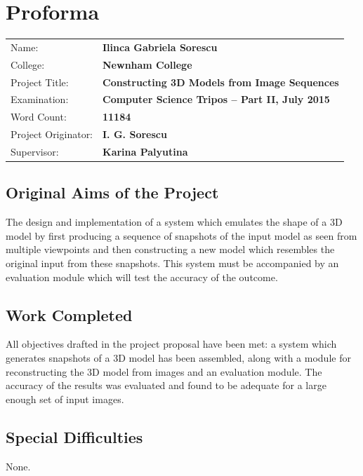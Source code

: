 \documentclass[12pt,a4paper,twoside,openright]{report}
\begin{document}

\pagestyle{plain}

\chapter*{Proforma}

{\large
\begin{tabular}{ll}
Name:               & \bf Ilinca Gabriela Sorescu                       \\
College:            & \bf Newnham College                               \\
Project Title:      & \bf Constructing 3D Models from Image Sequences   \\
Examination:        & \bf Computer Science Tripos -- Part II, July 2015  \\
Word Count:         & \bf 11184 \\
Project Originator: & \bf I. G. Sorescu                     \\
Supervisor:         & \bf Karina Palyutina                  \\ 
\end{tabular}
}



\section*{Original Aims of the Project}
The design and implementation of a system which emulates the shape of a 3D model by first producing a sequence of snapshots of the input model as seen from multiple viewpoints and then constructing a new model which resembles the original input from these snapshots. This system must be accompanied by an evaluation module which will test the accuracy of the outcome.


\section*{Work Completed}
All objectives drafted in the project proposal have been met: a system which generates snapshots of a 3D model has been assembled, along with a module for reconstructing the 3D model from images and an evaluation module. The accuracy of the results was evaluated and found to be adequate for a large enough set of input images.  

\section*{Special Difficulties}
None.
\end{document}
